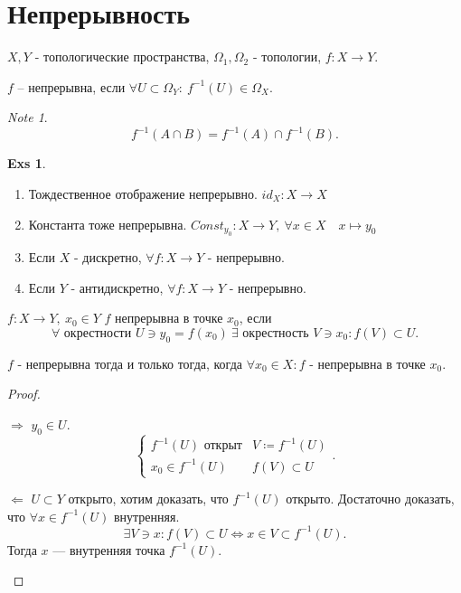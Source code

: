 \documentclass[11pt]{book}
\theoremstyle{definition}
\theoremstyle{plain}
\theoremstyle{plain}
\theoremstyle{definition}
\newtheorem*{exs}{Exs}
\theoremstyle{remark}
\newtheorem*{note}{Note}
\begin{document}
\section{Непрерывность}
$X, Y$ - топологические пространства, $\Omega_1, \Omega_2$ -  топологии, $f: X \to  Y$.
\begin{defn}
    $f$ -- непрерывна, если $\forall U \subset \Omega _Y: ~ f^{-1} (U) \in  \Omega_X$.
\end{defn}
\begin{note}
    \[
	f^{-1} (A \cap B) = f^{-1}(A) \cap f^{-1}(B)
    .\]
\end{note}
\begin{exs}
    $ $
    \begin{enumerate}
	\item Тождественное отображение непрерывно. $id_X : X \to  X$
	\item Константа тоже непрерывна. $Const_{y_0}:X \to Y, ~ \forall x \in  X \quad x\mapsto y_0 $
	\item Если $X$ - дискретно, $\forall f: X \to  Y$ - непрерывно.
	\item Если $Y$ - антидискретно, $\forall f: X \to  Y$ - непрерывно.
    \end{enumerate}
\end{exs}
\begin{defn}
    $f: X \to  Y, ~ x_0 \in Y$
    $f$ непрерывна в точке $ x_0$, если \[
	\forall \mbox{ окрестности } U \ni y_0 = f(x_0) ~ \exists \mbox{ окрестность } V \ni x_0: f(V) \subset U
    .\]
\end{defn}
\begin{thm}
    $f$ - непрерывна тогда и только тогда, когда $\forall x_0 \in  X: f$ - непрерывна в точке $x_0$.
\end{thm}
\begin{proof}
    $ $
    \begin{description}
	\item $ \boxed{ \Longrightarrow }$
    $y_0 \in  U$.
    \[
	    \begin{cases}
		f^{-1}(U) \mbox{ открыт} & V\coloneqq f^{-1}(U)\\
		x_0 \in f^{-1}(U) & f(V) \subset U
	    \end{cases}
    .\]
	\item $ \boxed{ \Longleftarrow  }$
    $U \subset Y$  открыто, хотим доказать, что $f^{-1}(U)$  открыто.
    Достаточно доказать, что $\forall x \in  f^{-1}(U) $ внутренняя.
    \[
	\exists V \ni x: f(V)\subset U \Leftrightarrow x \in  V \subset f^{-1}(U)
    .\]
    Тогда $x$ --- внутренняя точка $f^{-1}(U)$.
    \end{description}
\end{proof}
\end{document}
